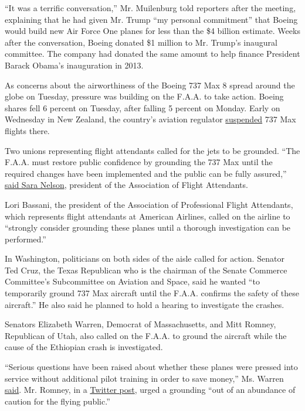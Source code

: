 ``It was a terrific conversation,'' Mr. Muilenburg told reporters after
the meeting, explaining that he had given Mr. Trump ``my personal
commitment'' that Boeing would build new Air Force One planes for less
than the \$4 billion estimate. Weeks after the conversation, Boeing
donated \$1 million to Mr. Trump's inaugural committee. The company had
donated the same amount to help finance President Barack Obama's
inauguration in 2013.

As concerns about the airworthiness of the Boeing 737 Max 8 spread
around the globe on Tuesday, pressure was building on the F.A.A. to take
action. Boeing shares fell 6 percent on Tuesday, after falling 5 percent
on Monday. Early on Wednesday in New Zealand, the country's aviation
regulator
\href{https://www.caa.govt.nz/public-and-media-info/caa-releases/boeing-737-max-suspension/}{suspended}
737 Max flights there.

Two unions representing flight attendants called for the jets to be
grounded. ``The F.A.A. must restore public confidence by grounding the
737 Max until the required changes have been implemented and the public
can be fully assured,''
\href{https://www.afacwa.org/afa_statement_on_737_max}{said Sara
Nelson}, president of the Association of Flight Attendants.

Lori Bassani, the president of the Association of Professional Flight
Attendants, which represents flight attendants at American Airlines,
called on the airline to ``strongly consider grounding these planes
until a thorough investigation can be performed.''

In Washington, politicians on both sides of the aisle called for action.
Senator Ted Cruz, the Texas Republican who is the chairman of the Senate
Commerce Committee's Subcommittee on Aviation and Space, said he wanted
``to temporarily ground 737 Max aircraft until the F.A.A. confirms the
safety of these aircraft.'' He also said he planned to hold a hearing to
investigate the crashes.

Senators Elizabeth Warren, Democrat of Massachusetts, and Mitt Romney,
Republican of Utah, also called on the F.A.A. to ground the aircraft
while the cause of the Ethiopian crash is investigated.

``Serious questions have been raised about whether these planes were
pressed into service without additional pilot training in order to save
money,'' Ms. Warren
\href{https://www.masslive.com/politics/2019/03/elizabeth-warren-urges-faa-to-ground-boeing-737-max-8-planes.html}{said}.
Mr. Romney, in a
\href{https://twitter.com/MittRomney/status/1105470096691089413}{Twitter
post}, urged a grounding ``out of an abundance of caution for the flying
public.''

